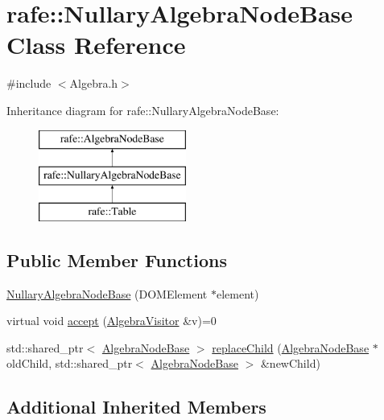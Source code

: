\hypertarget{classrafe_1_1_nullary_algebra_node_base}{\section{rafe\+:\+:Nullary\+Algebra\+Node\+Base Class Reference}
\label{classrafe_1_1_nullary_algebra_node_base}
}


{\ttfamily \#include $<$Algebra.\+h$>$}

Inheritance diagram for rafe\+:\+:Nullary\+Algebra\+Node\+Base\+:\begin{figure}[H]
\begin{center}
\leavevmode
\includegraphics[height=3.000000cm]{classrafe_1_1_nullary_algebra_node_base}
\end{center}
\end{figure}
\subsection*{Public Member Functions}
\begin{DoxyCompactItemize}
\item 
\hyperlink{classrafe_1_1_nullary_algebra_node_base_ad27b12a11492ddc6d3d07f1781e0dfcf}{Nullary\+Algebra\+Node\+Base} (D\+O\+M\+Element $\ast$element)
\item 
virtual void \hyperlink{classrafe_1_1_nullary_algebra_node_base_a4e1bc16e76d9e41a8fb575008d8f15e5}{accept} (\hyperlink{classrafe_1_1_algebra_visitor}{Algebra\+Visitor} \&v)=0
\item 
std\+::shared\+\_\+ptr$<$ \hyperlink{classrafe_1_1_algebra_node_base}{Algebra\+Node\+Base} $>$ \hyperlink{classrafe_1_1_nullary_algebra_node_base_aa600eac4377bac4699834b0fbf1a4051}{replace\+Child} (\hyperlink{classrafe_1_1_algebra_node_base}{Algebra\+Node\+Base} $\ast$old\+Child, std\+::shared\+\_\+ptr$<$ \hyperlink{classrafe_1_1_algebra_node_base}{Algebra\+Node\+Base} $>$ \&new\+Child)
\end{DoxyCompactItemize}
\subsection*{Additional Inherited Members}


